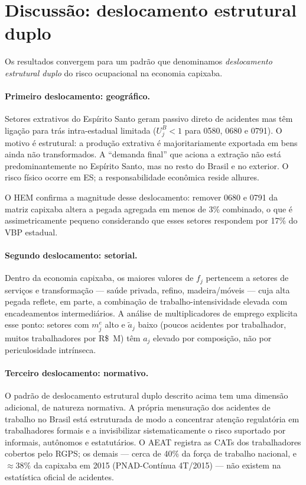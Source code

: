 \documentclass[12pt, a4paper]{article}
\begin{document}
\section{Discussão: deslocamento estrutural duplo}
\label{sec:discussao}

Os resultados convergem para um padrão que denominamos
\textit{deslocamento estrutural duplo} do risco ocupacional na
economia capixaba.

\paragraph{Primeiro deslocamento: geográfico.}
Setores extrativos do Espírito Santo geram passivo direto de acidentes
mas têm ligação para trás intra-estadual limitada ($U^B_j < 1$ para
0580, 0680 e 0791). O motivo é estrutural: a produção extrativa é
majoritariamente exportada em bens ainda não transformados. A
``demanda final'' que aciona a extração não está predominantemente
no Espírito Santo, mas no resto do Brasil e no exterior. O risco
físico ocorre em ES; a responsabilidade econômica reside alhures.

O HEM confirma a magnitude desse deslocamento: remover 0680 e 0791
da matriz capixaba altera a pegada agregada em menos de 3\% combinado,
o que é assimetricamente pequeno considerando que esses setores
respondem por 17\% do VBP estadual.

\paragraph{Segundo deslocamento: setorial.}
Dentro da economia capixaba, os maiores valores de $f_j$ pertencem
a setores de serviços e transformação --- saúde privada, refino,
madeira/móveis --- cuja alta pegada reflete, em parte, a combinação
de trabalho-intensividade elevada com encadeamentos intermediários.
A análise de multiplicadores de emprego explicita esse ponto: setores
com $m^e_j$ alto e $\tilde{a}_j$ baixo (poucos acidentes por
trabalhador, muitos trabalhadores por R\$~M) têm $a_j$ elevado por
composição, não por periculosidade intrínseca.

\paragraph{Terceiro deslocamento: normativo.}
O padrão de deslocamento estrutural duplo descrito acima tem uma
dimensão adicional, de natureza normativa. A própria mensuração dos
acidentes de trabalho no Brasil está estruturada de modo a concentrar
atenção regulatória em trabalhadores formais e a invisibilizar
sistematicamente o risco suportado por informais, autônomos e
estatutários. O AEAT registra as CATs dos trabalhadores cobertos pelo
RGPS; os demais --- cerca de 40\% da força de trabalho nacional, e
$\approx 38\%$ da capixaba em 2015 (PNAD-Contínua 4T/2015) --- não
existem na estatística oficial de acidentes.
\end{document}
